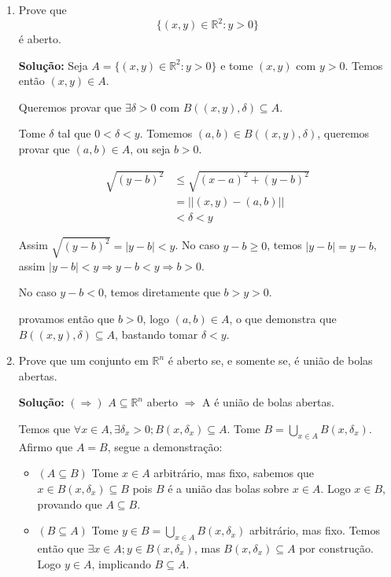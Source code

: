 \documentclass[12pt]{article}
\newcommand{\N}{\mathbb{N}}
\newcommand{\Q}{\mathbb{Q}}
\newcommand{\rn}{\mathbb{R}^n}
\newcommand{\dps}{\displaystyle}
\begin{document}
\begin{enumerate}
Seja $A_n=(\sqrt2-1/n,\sqrt2+1/n)$. Temos $A_n\searrow\{\sqrt2\}$ (i.e $A_n\supset A_{n+1}$ e $\bigcap_{n\in\N}A_n=\{\sqrt2\}$).

Para cada $n\in\N$ escolha $q^*_n\in A_n\cap\Q$ qualquer, pela densidade dos racionais isso é sempre possível para todo $n$. Como $A_n\searrow\{\sqrt2\}$, então $\lim q^*_n=\sqrt2\notin\Q$. Dessa forma $\Q$ não é fechado.

\textbf{}
\item Prove que 
\[
\{(x,y) \in \mathbb{R}^2: y>0\}
\]
\'e aberto.

\textbf{Solução:} Seja $A=\{(x,y) \in \mathbb{R}^2: y>0\}$ e tome $(x,y)$ com $y>0$. Temos então $(x,y)\in A$.

Queremos provar que $\exists \delta>0$ com $B((x,y),\delta)\subseteq A$.

Tome $\delta$ tal que $0<\delta<y$. Tomemos $(a,b)\in B((x,y),\delta)$, queremos provar que $(a,b)\in A$, ou seja $b>0$.

\begin{align*}
	\sqrt{(y-b)^2}&\leq\sqrt{(x-a)^2+(y-b)^2}\\
	&=||(x,y)-(a,b)||\\
	&<\delta<y
\end{align*}

Assim $\sqrt{(y-b)^2}=|y-b|<y$. No caso $y-b\geq0$, temos $|y-b|=y-b$, assim $|y-b|<y\Rightarrow y-b<y\Rightarrow b>0$.

No caso $y-b<0$, temos diretamente que $b>y>0$.

provamos então que $b>0$, logo $(a,b)\in A$, o que demonstra que $B((x,y),\delta)\subseteq A$, bastando tomar $\delta<y$.
\item Prove que um conjunto em $\mathbb{R}^n$ \'e aberto se, e somente se, \'e uni\~ao de bolas abertas.

\textbf{Solução:} $(\Rightarrow)$ $A\subseteq\rn$ aberto $\Rightarrow$ A é união de bolas abertas.

Temos que $\forall x\in A,\exists \delta_x>0;B(x,\delta_x)\subseteq A$. Tome $B=\dps\bigcup_{x\in A}B(x,\delta_x)$. Afirmo que $A=B$, segue a demonstração:

\begin{itemize}
	\item $(A\subseteq B)$ Tome $x\in A$ arbitrário, mas fixo, sabemos que  $x\in B(x,\delta_x)\subseteq B$ pois $B$ é a união das bolas sobre $x\in A$. Logo $x\in B$, provando que $A\subseteq B$.
	
	\item $(B\subseteq A)$ Tome $y\in B=\dps\bigcup_{x\in A}B(x,\delta_x)$ arbitrário, mas fixo. Temos então que $\exists x\in A;y\in B(x,\delta_x)$, mas $B(x,\delta_x)\subseteq A$ por construção. Logo $y\in A$, implicando $B\subseteq A$.
\end{itemize}


\end{enumerate}
\end{document}
